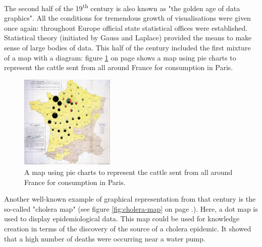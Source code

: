 The second half of the 19\textsuperscript{th} century is also known as "the golden age of data graphics". All the conditions for tremendous growth of visualisations were given once again: throughout Europe official state statistical offices were established.
Statistical theory (initiated by Gauss and Laplace) provided the means to make sense of large bodies of data.
This half of the century included the first mixture of a map with a diagram: figure \ref{fig:first-mixture} on page \pageref{fig:first-mixture} shows a map using pie charts to represent the cattle sent from all around France for consumption in Paris.

\begin{figure}[!htb]
\centering
\includegraphics[width=0.4\textwidth,keepaspectratio]{images/history/minard.png}
\caption[
    A map using pie charts to represent the cattle sent from all around France for consumption in Paris., Urldate: 07.2016 \newline
\small\texttt{\url{https://upload.wikimedia.org/wikipedia/commons/1/1c/Minard-carte-viande-1858.png}}
]{A map using pie charts to represent the cattle sent from all around France for consumption in Paris.}
\label{fig:first-mixture}
\end{figure}

Another well-known example of graphical representation from that century is the so-called "cholera map" (see figure \ref{fig:cholera-map} on page \pageref{fig:cholera-map}.). Here, a dot map is used to display epidemiological data. This map could be used for knowledge creation in terms of the discovery of the source of a cholera epidemic. It showed that a high number of deaths were occurring near a water pump.


